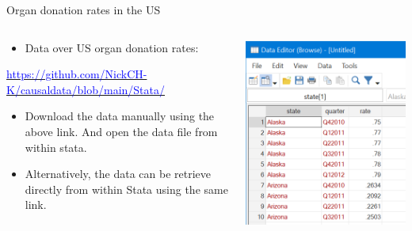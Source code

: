 \documentclass[notes,11pt, aspectratio=169]{beamer}
\begin{document}
\begin{frame}{Organ donation rates in the US}
\begin{columns}
\begin{column}{0.5\textwidth}
  
\begin{itemize}
    \item Data over US organ donation rates:
\end{itemize}

\href{https://github.com/NickCH-K/causaldata/blob/main/Stata/}{\textcolor{blue}{https://github.com/NickCH-K/causaldata/blob/main/Stata/}}

\begin{itemize}
    \item Download the data manually using the above link. And open the data file from within stata.
    \item Alternatively, the data can be retrieve directly from within Stata using the same link.
\end{itemize}
\end{column}

\begin{column}{0.5\textwidth}
 \begin{center}
        \includegraphics[width=0.7\linewidth]{24_DiDLecture/24_DiDLecture_LoadData.png}
    \end{center}
\end{column}
\end{columns}
\end{frame}
\end{document}

